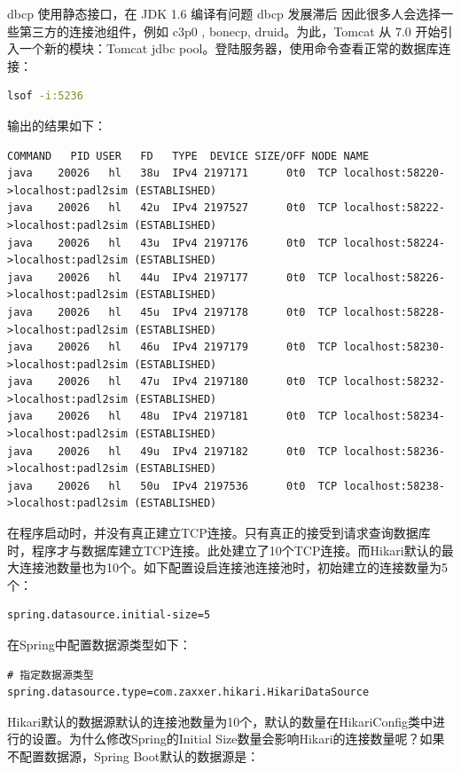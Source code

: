 \documentclass[letter]{book}
\begin{document}
dbcp 使用静态接口，在 JDK 1.6 编译有问题
dbcp 发展滞后
因此很多人会选择一些第三方的连接池组件，例如 c3p0 , bonecp, druid。为此，Tomcat 从 7.0 开始引入一个新的模块：Tomcat jdbc pool。登陆服务器，使用命令查看正常的数据库连接：

\begin{lstlisting}[language=Bash]
lsof -i:5236
\end{lstlisting}

输出的结果如下：

\begin{lstlisting}
COMMAND   PID USER   FD   TYPE  DEVICE SIZE/OFF NODE NAME
java    20026   hl   38u  IPv4 2197171      0t0  TCP localhost:58220->localhost:padl2sim (ESTABLISHED)
java    20026   hl   42u  IPv4 2197527      0t0  TCP localhost:58222->localhost:padl2sim (ESTABLISHED)
java    20026   hl   43u  IPv4 2197176      0t0  TCP localhost:58224->localhost:padl2sim (ESTABLISHED)
java    20026   hl   44u  IPv4 2197177      0t0  TCP localhost:58226->localhost:padl2sim (ESTABLISHED)
java    20026   hl   45u  IPv4 2197178      0t0  TCP localhost:58228->localhost:padl2sim (ESTABLISHED)
java    20026   hl   46u  IPv4 2197179      0t0  TCP localhost:58230->localhost:padl2sim (ESTABLISHED)
java    20026   hl   47u  IPv4 2197180      0t0  TCP localhost:58232->localhost:padl2sim (ESTABLISHED)
java    20026   hl   48u  IPv4 2197181      0t0  TCP localhost:58234->localhost:padl2sim (ESTABLISHED)
java    20026   hl   49u  IPv4 2197182      0t0  TCP localhost:58236->localhost:padl2sim (ESTABLISHED)
java    20026   hl   50u  IPv4 2197536      0t0  TCP localhost:58238->localhost:padl2sim (ESTABLISHED)
\end{lstlisting}

在程序启动时，并没有真正建立TCP连接。只有真正的接受到请求查询数据库时，程序才与数据库建立TCP连接。此处建立了10个TCP连接。而Hikari默认的最大连接池数量也为10个。如下配置设启连接池连接池时，初始建立的连接数量为5个：

\begin{lstlisting}
spring.datasource.initial-size=5
\end{lstlisting}

在Spring中配置数据源类型如下：

\begin{lstlisting}
# 指定数据源类型
spring.datasource.type=com.zaxxer.hikari.HikariDataSource
\end{lstlisting}

Hikari默认的数据源默认的连接池数量为10个，默认的数量在HikariConfig类中进行的设置。为什么修改Spring的Initial Size数量会影响Hikari的连接数量呢？如果不配置数据源，Spring Boot默认的数据源是：
\end{document}
